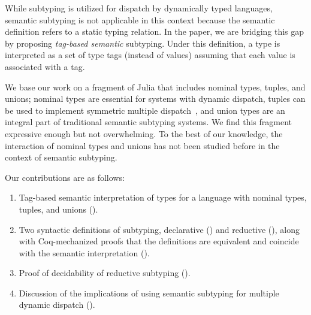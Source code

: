 While subtyping is utilized for dispatch by dynamically typed languages,
semantic subtyping is not applicable in this context
because the semantic definition refers to a static typing relation.
In the paper, we are bridging this gap 
by proposing \emph{tag-based semantic} subtyping.
Under this definition, a type is interpreted as a set of type tags 
(instead of values)
assuming that each value is associated with a tag.

We base our work on a fragment of Julia that includes
nominal types, tuples, and unions;
nominal types are essential for systems with dynamic dispatch,
tuples can be used to implement symmetric multiple 
dispatch~\cite{bib:Leavens:1998:mddtuples},
and union types are an integral part of traditional semantic subtyping systems.
We find this fragment expressive enough but not overwhelming.
To the best of our knowledge, 
the interaction of nominal types and unions 
has not been studied before in the context of semantic subtyping.

Our contributions are as follows:
\begin{enumerate}
  \item Tag-based semantic interpretation of types for a language
    with nominal types, tuples, and unions ().
  \item Two syntactic definitions of subtyping, 
    declarative () and reductive (),
    along with Coq-mechanized proofs that the definitions are equivalent
    and coincide with the semantic interpretation (). 	
  \item Proof of decidability of reductive subtyping ().
  \item Discussion of the implications of using semantic subtyping
    for multiple dynamic dispatch ().
\end{enumerate}






